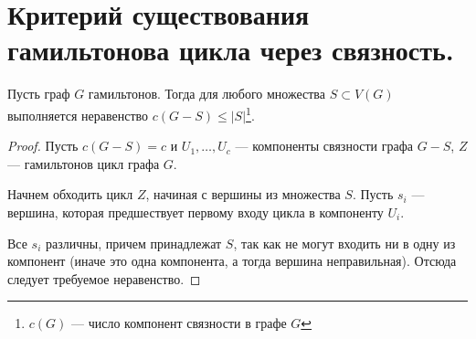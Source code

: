 \section{Критерий существования гамильтонова цикла через связность.}
\begin{lemma}\label{lm:circle_3}
    Пусть граф $G$ гамильтонов. Тогда для любого множества $S \subset V(G)$
	выполняется неравенство $c(G - S) \le \lvert S \rvert$\footnote{$c(G)$ --- число компонент связности в графе $G$}.
\end{lemma}
\begin{proof}
	Пусть $c(G-S) = c$ и $U_1, \ldots , U_c$ --- компоненты связности графа $G - S$, $Z$ --- гамильтонов цикл графа $G$.

	Начнем обходить цикл $Z$, начиная с вершины из множества $S$. Пусть $s_i$ --- вершина, которая предшествует первому входу цикла в компоненту $U_i$.

	Все $s_i$ различны, причем принадлежат $S$, так как не могут входить ни в одну из компонент (иначе это одна компонента, а тогда вершина неправильная). Отсюда следует требуемое неравенство.
\end{proof}

